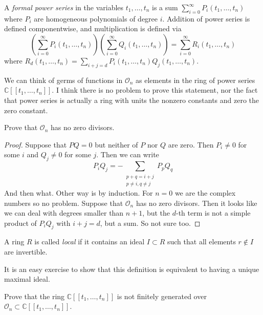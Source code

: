 \begin{definition}
\label{definition-formal-power-series}
A {\it formal power series} in the variables $t_1,\ldots,t_n$ is a sum
$\sum_{i=0}^{\infty}P_i(t_1,\ldots,t_n)$ where $P_i$ are homogeneous polynomials
of degree $i$. Addition of power series is defined componentwise, and
multiplication is defined via
$$
\left(\sum_{i=0}^\infty P_i(t_1,\ldots,t_n)\right)
\left(\sum_{i=0}^\infty Q_i(t_1,\ldots,t_n)\right)
=\sum_{i=0}^\infty R_i(t_1,\ldots,t_n)
$$
where $R_d(t_1,\ldots,t_n)=\sum_{i+j=d}P_i(t_1,\ldots,t_n)Q_j(t_1,\ldots,t_n)$.
\end{definition}

We can think of germs of functions in $\mathcal{O}_n$ as elements in the ring of
power series $\mathbb{C}[\![t_1,\ldots,t_n]\!]$. I think there is no problem to
prove this statement, nor the fact that power series is actually a ring with
units the nonzero constants and zero the zero constant.

\begin{exercise}
\label{exercise-stalk-has-no-zero-divisors}
Prove that $\mathcal{O}_n$ has no zero divisors.
\end{exercise}

\begin{proof}
Suppose that $PQ=0$ but neither of $P$ nor $Q$ are zero. Then $P_i \neq 0$ for
some $i$ and $Q_j \neq 0$ for some $j$. Then we can write
$$
P_iQ_j=-\sum_{\substack{p+q=i+j \\ p\neq i,q\neq j}}P_pQ_q
$$
And then what. Other way is by induction. For $n=0$ we are the complex numbers
so no problem. Suppose that $\mathcal{O}_n$ has no zero divisors. Then it looks
like we can deal with degrees smaller than $n+1$, but the $d$-th term is not a
simple product of $P_iQ_j$ with $i+j=d$, but a sum. So not sure too.
\end{proof}

\begin{definition}
\label{definition-local-ring}
A ring $R$ is called {\it local} if it contains an ideal $I\subset R$ such that
all elements $r \not \in I$ are invertible.
\end{definition}

It is an easy exercise to show that this definition is equivalent to having a
unique maximal ideal.

\begin{exercise}
\label{exercise-power-series-is-not-finitely-generated-over-stalk}
Prove that the ring $\mathbb{C}[\![ t_1,\ldots,t_n]\!]$ is not
finitely generated over $\mathcal{O}_n \subset 
\mathbb{C}[\![ t_1,\ldots,t_n]\!]$.
\end{exercise}


